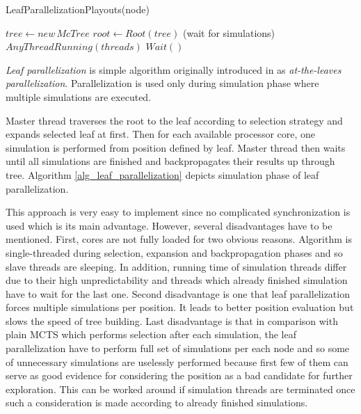 \begin{algorithm}
\DontPrintSemicolon
\caption{LeafParallelizationPlayouts(node)}
\label{alg_leaf_parallelization}

$tree \leftarrow new\,McTree$ \;
$root \leftarrow Root(tree)$\;
\While(wait for simulations){$AnyThreadRunning(threads)$}{
    $Wait()$\;
}
\end{algorithm}

\emph{Leaf parallelization} is simple algorithm originally introduced in \cite{Cazenave2007} as
\emph{at-the-leaves parallelization}. Parallelization is used only during simulation phase where
multiple simulations are executed. 

Master thread traverses the root to the leaf according to selection strategy and expands selected
leaf at first. Then for each available processor core, one simulation is performed from position
defined by leaf. Master thread then waits until all simulations are finished and backpropagates
their results up through tree. Algorithm \ref{alg_leaf_parallelization} depicts simulation phase 
of leaf parallelization. 

This approach is very easy to implement since no complicated synchronization is used
which is its main advantage. However, several disadvantages have to be mentioned. First, cores are
not fully loaded for two obvious reasons. Algorithm is single-threaded during selection, expansion
and backpropagation phases and so slave threads are sleeping. In addition, running time of
simulation threads differ due to their high unpredictability and threads which already finished
simulation have to wait for the last one. Second disadvantage is one that leaf parallelization
forces multiple simulations
per position. It leads to better position evaluation but slows the speed of tree building. Last
disadvantage is that in comparison with plain MCTS which performs selection after each simulation,
the leaf parallelization have to perform full set of simulations per each node and so some of
unnecessary simulations are uselessly performed because first few of them can serve as good evidence
for considering the position as a bad candidate for further exploration. This can be worked around
if simulation threads are terminated once such a consideration is made according to already finished
simulations.

